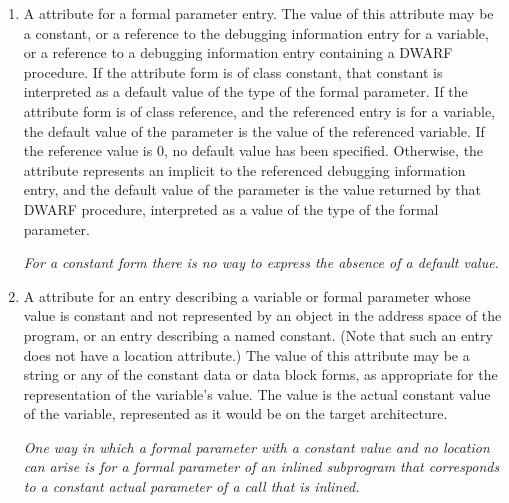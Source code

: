 \begin{enumerate}[1. ]
\item A \DWATdefaultvalueDEFN{} attribute 
for 
a formal parameter
\hypertarget{chap:DWATdefaultvaluedefaultvalueofparameter}{}
entry. The value of this attribute may be a constant, or a reference to the
debugging information entry for a variable, or a reference to a
debugging information entry containing a DWARF procedure.  If the
attribute form is of class constant, that constant is interpreted as
a default value of the type of the formal parameter. If the attribute
form is of class reference, and the referenced entry is for a
variable, the default value of the parameter is the value of the
referenced variable.  If the reference value is 0, no default value
has been specified.  Otherwise, the attribute represents an implicit
\DWOPcallref{} to the referenced debugging information entry, and
the default value of the parameter is the value returned by that
DWARF procedure, interpreted as a value of the type of the formal
parameter.

\textit{For a constant form there is no way to 
express the absence of a default value.}

\item A \DWATconstvalueDEFN{} attribute
\hypertarget{chap:DWATconstvalueconstantobject}{}
for an entry describing a
variable or formal parameter whose value is constant and not
represented by an object in the address space of the program,
or an entry describing a named constant. (Note that such
an entry does not have a location attribute.) The value of
this attribute may be a string or any of the constant data
or data block forms, 
as appropriate for the representation
of the variable's value. The value is the actual constant
value of the variable, represented as it would be on the
target architecture.  

\textit{One way in which a formal parameter
with a constant value and no location can arise is for a
formal parameter of an inlined subprogram that corresponds
to a constant actual parameter of a call that is inlined.
}


\end{enumerate}
